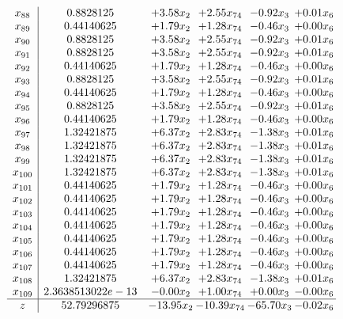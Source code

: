\documentclass[8pt]{article}
\begin{document}
\[\begin{array}{c| c c@{\hskip 2pt} c@{\hskip 2pt} c@{\hskip 2pt} c@{\hskip 2pt} }
 x_{88}   &  0.8828125 & +  3.58 x_{2} & +  2.55 x_{74} & -0.92 x_{3} & +  0.01 x_{6}\\
 x_{89}   &  0.44140625 & +  1.79 x_{2} & +  1.28 x_{74} & -0.46 x_{3} & +  0.00 x_{6}\\
 x_{90}   &  0.8828125 & +  3.58 x_{2} & +  2.55 x_{74} & -0.92 x_{3} & +  0.01 x_{6}\\
 x_{91}   &  0.8828125 & +  3.58 x_{2} & +  2.55 x_{74} & -0.92 x_{3} & +  0.01 x_{6}\\
 x_{92}   &  0.44140625 & +  1.79 x_{2} & +  1.28 x_{74} & -0.46 x_{3} & +  0.00 x_{6}\\
 x_{93}   &  0.8828125 & +  3.58 x_{2} & +  2.55 x_{74} & -0.92 x_{3} & +  0.01 x_{6}\\
 x_{94}   &  0.44140625 & +  1.79 x_{2} & +  1.28 x_{74} & -0.46 x_{3} & +  0.00 x_{6}\\
 x_{95}   &  0.8828125 & +  3.58 x_{2} & +  2.55 x_{74} & -0.92 x_{3} & +  0.01 x_{6}\\
 x_{96}   &  0.44140625 & +  1.79 x_{2} & +  1.28 x_{74} & -0.46 x_{3} & +  0.00 x_{6}\\
 x_{97}   &  1.32421875 & +  6.37 x_{2} & +  2.83 x_{74} & -1.38 x_{3} & +  0.01 x_{6}\\
 x_{98}   &  1.32421875 & +  6.37 x_{2} & +  2.83 x_{74} & -1.38 x_{3} & +  0.01 x_{6}\\
 x_{99}   &  1.32421875 & +  6.37 x_{2} & +  2.83 x_{74} & -1.38 x_{3} & +  0.01 x_{6}\\
 x_{100}   &  1.32421875 & +  6.37 x_{2} & +  2.83 x_{74} & -1.38 x_{3} & +  0.01 x_{6}\\
 x_{101}   &  0.44140625 & +  1.79 x_{2} & +  1.28 x_{74} & -0.46 x_{3} & +  0.00 x_{6}\\
 x_{102}   &  0.44140625 & +  1.79 x_{2} & +  1.28 x_{74} & -0.46 x_{3} & +  0.00 x_{6}\\
 x_{103}   &  0.44140625 & +  1.79 x_{2} & +  1.28 x_{74} & -0.46 x_{3} & +  0.00 x_{6}\\
 x_{104}   &  0.44140625 & +  1.79 x_{2} & +  1.28 x_{74} & -0.46 x_{3} & +  0.00 x_{6}\\
 x_{105}   &  0.44140625 & +  1.79 x_{2} & +  1.28 x_{74} & -0.46 x_{3} & +  0.00 x_{6}\\
 x_{106}   &  0.44140625 & +  1.79 x_{2} & +  1.28 x_{74} & -0.46 x_{3} & +  0.00 x_{6}\\
 x_{107}   &  0.44140625 & +  1.79 x_{2} & +  1.28 x_{74} & -0.46 x_{3} & +  0.00 x_{6}\\
 x_{108}   &  1.32421875 & +  6.37 x_{2} & +  2.83 x_{74} & -1.38 x_{3} & +  0.01 x_{6}\\
 x_{109}   &  2.3638513022e-13 & -0.00 x_{2} & +  1.00 x_{74} & +  0.00 x_{3} & -0.00 x_{6}\\
\hline
z    &  52.79296875 & -13.95 x_{2} & -10.39 x_{74} & -65.70 x_{3} & -0.02 x_{6}\\
\end{array}\]
\end{document}
